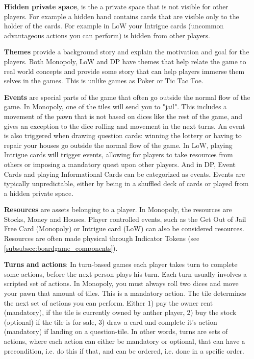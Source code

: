 \textbf{Hidden private space}, is the a private space that is not visible for other players. For example a hidden hand contains cards that are visible only to the holder of the cards. For example in LoW your Intrigue cards (uncommon advantageous actions you can perform) is hidden from other players. 

\textbf{Themes} provide a background story and explain the motivation and goal for the players. Both Monopoly, LoW and DP have themes that help relate the game to real world concepts and provide some story that can help players immerse them selves in the games. This is unlike games as Poker or Tic Tac Toe.

\textbf{Events} are special parts of the game that often go outside the normal flow of the game. In Monopoly, one of the tiles will send you to "jail". This includes a movement of the pawn that is not based on dices like the rest of the game, and gives an exception to the dice rolling and movement in the next turns. An event is also triggered when drawing question cards: winning the lottery or having to repair your houses go outside the normal flow of the game. In LoW, playing Intrigue cards will trigger events, allowing for players to take resources from others or imposing a mandatory quest upon other players. And in DP, Event Cards and playing Informational Cards can be categorized as events. Events are typically unpredictable, either by being in a shuffled deck of cards or played from a hidden private space.

\textbf{Resources} are assets belonging to a player. In Monopoly, the resources are Stocks, Money and Houses. Player controlled events, such as the Get Out of Jail Free Card (Monopoly) or Intrigue card (LoW) can also be considered resources. Resources are often made physical through Indicator Tokens (see \ref{subsubsec:boardgame_components}).

\textbf{Turns and actions}: In turn-based games each player takes turn to complete some actions, before the next person plays his turn. Each turn usually involves a scripted set of actions. In Monopoly, you must always roll two dices and move your pawn that amount of tiles. This is a mandatory action. The tile determines the next set of actions you can perform. Either 1) pay the owner rent (mandatory), if the tile is currently owned by anther player, 2) buy the stock (optional) if the tile is for sale, 3) draw a card and complete it's action (mandatory) if landing on a question-tile. In other words, turns are sets of actions, where each action can either be mandatory or optional, that can have a precondition, i.e. do this if that, and can be ordered, i.e. done in a speific order.

